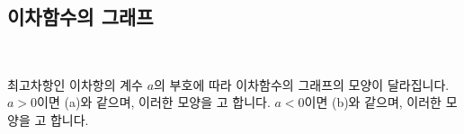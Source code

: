 \subsection{이차함수의 그래프}
\begin{figure}[h]\centering {}\
\qquad\qquad
\centering {}\
\end{figure}

최고차항인 이차항의 계수 $a$의 부호에 따라 이차함수의 그래프의 모양이 달라집니다. $a>0$이면 (a)와 같으며, 이러한 모양을 고 합니다. $a<0$이면 (b)와 같으며, 이러한 모양을 고 합니다. \vskip-10pt

